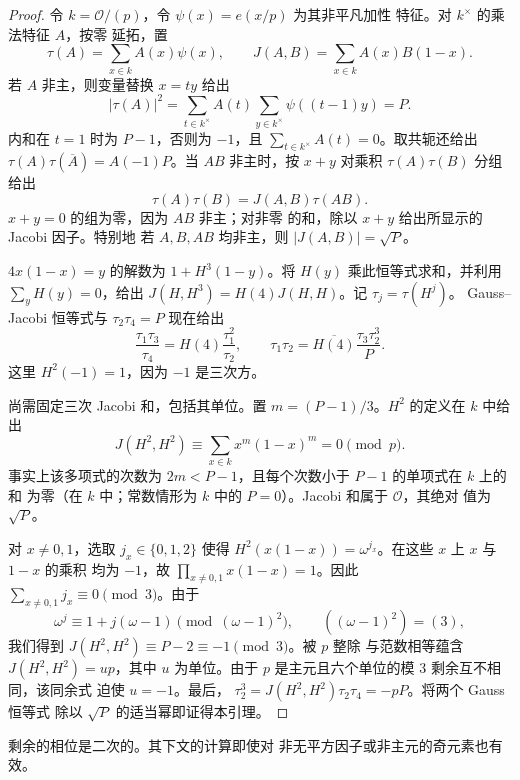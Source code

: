 \begin{proof}
令 $k=\mathcal O/(p)$，令 $\psi(x)=e(x/p)$ 为其非平凡加性
特征。对 $k^\times$ 的乘法特征 $A$，按零
延拓，置
\[
 \tau(A)=\sum_{x\in k}A(x)\psi(x),\qquad
 J(A,B)=\sum_{x\in k}A(x)B(1-x).
\]
若 $A$ 非主，则变量替换 $x=ty$ 给出
\[
 |\tau(A)|^2
 =\sum_{t\in k^\times}A(t)\sum_{y\in k^\times}\psi((t-1)y)=P.
\]
内和在 $t=1$ 时为 $P-1$，否则为 $-1$，且
$\sum_{t\in k^\times}A(t)=0$。取共轭还给出
$\tau(A)\tau(\overline A)=A(-1)P$。当 $AB$ 非主时，按 $x+y$ 对乘积
$\tau(A)\tau(B)$ 分组给出
\[
 \tau(A)\tau(B)=J(A,B)\tau(AB).
\]
$x+y=0$ 的组为零，因为 $AB$ 非主；对非零
的和，除以 $x+y$ 给出所显示的 Jacobi 因子。特别地
若 $A,B,AB$ 均非主，则 $|J(A,B)|=\sqrt P$。

$4x(1-x)=y$ 的解数为 $1+H^3(1-y)$。将 $H(y)$
乘此恒等式求和，并利用 $\sum_yH(y)=0$，给出
$J(H,H^3)=H(4)J(H,H)$。记 $\tau_j=\tau(H^j)$。
Gauss--Jacobi 恒等式与 $\tau_2\tau_4=P$ 现在给出
\[
 \frac{\tau_1\tau_3}{\tau_4}
   =H(4)\frac{\tau_1^2}{\tau_2},\qquad
 \tau_1\tau_2=\overline{H(4)}\frac{\tau_3\tau_2^3}{P}.
\]
这里 $H^2(-1)=1$，因为 $-1$ 是三次方。

尚需固定三次 Jacobi 和，包括其单位。置
$m=(P-1)/3$。$H^2$ 的定义在 $k$ 中给出
\[
 J(H^2,H^2)\equiv\sum_{x\in k}x^m(1-x)^m=0\pmod p.
\]
事实上该多项式的次数为 $2m<P-1$，且每个次数小于 $P-1$ 的单项式在 $k$ 上的和
为零（在 $k$ 中；常数情形为 $k$
中的 $P=0$）。Jacobi 和属于 $\mathcal O$，其绝对
值为 $\sqrt P$。

对 $x\ne0,1$，选取 $j_x\in\{0,1,2\}$ 使得
$H^2(x(1-x))=\omega^{j_x}$。在这些 $x$ 上 $x$ 与 $1-x$ 的乘积
均为 $-1$，故 $\prod_{x\ne0,1}x(1-x)=1$。因此
$\sum_{x\ne0,1}j_x\equiv0\pmod3$。由于
\[
 \omega^j\equiv1+j(\omega-1)\pmod{(\omega-1)^2},
 \qquad ((\omega-1)^2)=(3),
\]
我们得到 $J(H^2,H^2)\equiv P-2\equiv-1\pmod3$。被 $p$ 整除
与范数相等蕴含 $J(H^2,H^2)=up$，其中 $u$ 为单位。由于 $p$
是主元且六个单位的模 $3$ 剩余互不相同，该同余式
迫使 $u=-1$。最后，
$\tau_2^3=J(H^2,H^2)\tau_2\tau_4=-pP$。将两个 Gauss 恒等式
除以 $\sqrt P$ 的适当幂即证得本引理。
\end{proof}

剩余的相位是二次的。其下文的计算即使对
非无平方因子或非主元的奇元素也有效。

